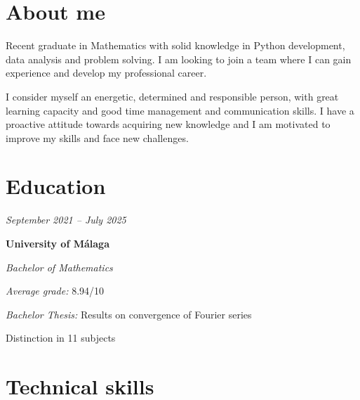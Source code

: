 \documentclass[10pt, letterpaper]{article}
\begin{document}
    \section{About me}
        \begin{onecolentry}
            Recent graduate in Mathematics with solid knowledge in Python development, data analysis and problem solving. I am looking to join a team where I can gain experience and develop my professional career.

            \vspace{0.2 cm}

            I consider myself an energetic, determined and responsible person, with great learning capacity and good time management and communication skills. I have a proactive attitude towards acquiring new knowledge and I am motivated to improve my skills and face new challenges.

        \end{onecolentry}

    \section{Education}

        \begin{twocolentry}{
            
        \textit{September 2021 – July 2025}}
            \textbf{University of Málaga}

            \textit{Bachelor of Mathematics}
        \end{twocolentry}

        \vspace{0.10 cm}
        \begin{onecolentry}
            \begin{highlights}
                \item \emph{Average grade:} 8.94/10 %
                \item \emph{Bachelor Thesis:} Results on convergence of Fourier series
                \item Distinction in 11 subjects
            \end{highlights}
        \end{onecolentry}
    
    \section{Technical skills}
 
\end{document}
